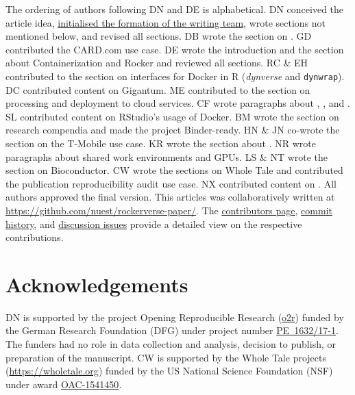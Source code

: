 The ordering of authors following DN and DE is alphabetical. DN
conceived the article idea,
\href{https://github.com/nuest/rockerverse-paper/issues/3}{initialised the formation of the writing team},
wrote sections not mentioned below, and revised all sections. DB wrote
the section on . GD contributed the CARD.com use case. DE
wrote the introduction and the section about Containerization and Rocker
and reviewed all sections. RC \& EH contributed to the section on
interfaces for Docker in R (\emph{dynverse} and \texttt{dynwrap}). DC
contributed content on Gigantum. ME contributed to the section on
processing and deployment to cloud services. CF wrote paragraphs about
, ,  and . SL
contributed content on RStudio's usage of Docker. BM wrote the section
on research compendia and made the project Binder-ready. HN \& JN
co-wrote the section on the T-Mobile use case. KR wrote the section
about . NR wrote paragraphs about shared work
environments and GPUs. LS \& NT wrote the section on Bioconductor. CW
wrote the sections on Whole Tale and contributed the publication
reproducibility audit use case. NX contributed content on .
All authors approved the final version. This articles was
collaboratively written at
\href{https://github.com/nuest/rockerverse-paper/}{https://github.com/nuest/rockerverse-paper/}.
The
\href{https://github.com/nuest/rockerverse-paper/graphs/contributors}{contributors page},
\href{https://github.com/nuest/rockerverse-paper/commits/master}{commit history},
and
\href{https://github.com/nuest/rockerverse-paper/issues/}{discussion issues}
provide a detailed view on the respective contributions.

\hypertarget{acknowledgements}{%
\section{Acknowledgements}\label{acknowledgements}}

DN is supported by the project Opening Reproducible Research
(\href{https://www.uni-muenster.de/forschungaz/project/12343}{o2r})
funded by the German Research Foundation (DFG) under project number
\href{https://gepris.dfg.de/gepris/projekt/415851837}{PE~1632/17-1}. The
funders had no role in data collection and analysis, decision to
publish, or preparation of the manuscript. CW is supported by the Whole
Tale projects (\url{https://wholetale.org}) funded by the US National
Science Foundation (NSF) under award
\href{https://www.nsf.gov/awardsearch/showAward?AWD_ID=1541450}{OAC-1541450}.

